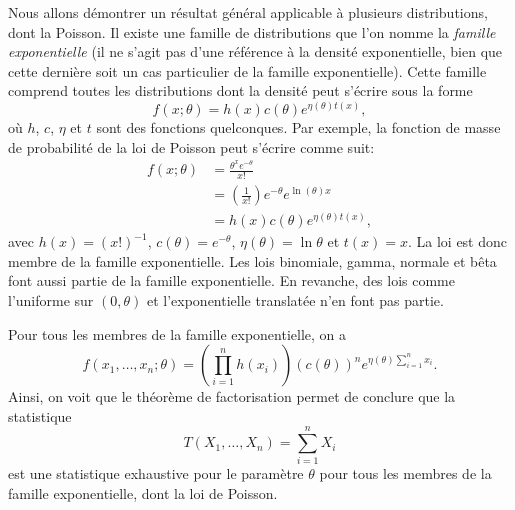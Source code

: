 \begin{solution}{3.13}
    Nous allons démontrer un résultat général applicable à plusieurs
    distributions, dont la Poisson. Il existe une famille de
    distributions que l'on nomme la \emph{famille exponentielle} (il
    ne s'agit pas d'une référence à la densité exponentielle, bien que
    cette dernière soit un cas particulier de la famille
    exponentielle). Cette famille comprend toutes les distributions
    dont la densité peut s'écrire sous la forme
    \begin{displaymath}
      f(x; \theta) = h(x) c(\theta) e^{\eta(\theta) t(x)},
    \end{displaymath}
    où $h$, $c$, $\eta$ et $t$ sont des fonctions quelconques. Par
    exemple, la fonction de masse de probabilité de la loi de Poisson
    peut s'écrire comme suit:
    \begin{align*}
      f(x; \theta) &= \frac{\theta^x e^{-\theta}}{x!} \\
      &= \left( \frac{1}{x!} \right) e^{-\theta} e^{\ln(\theta) x} \\
      &= h(x) c(\theta) e^{\eta(\theta) t(x)},
    \end{align*}
    avec $h(x) = (x!)^{-1}$, $c(\theta) = e^{-\theta}$, $\eta(\theta)
    = \ln \theta$ et $t(x) = x$. La loi est donc membre de la famille
    exponentielle. Les lois binomiale, gamma, normale et bêta font
    aussi partie de la famille exponentielle. En revanche, des lois
    comme l'uniforme sur $(0,\theta)$ et l'exponentielle translatée
    n'en font pas partie.

    Pour tous les membres de la famille exponentielle, on a
    \begin{equation*}
      f(x_1, \dots, x_n; \theta) =
      \left( \prod_{i = 1}^n h(x_i) \right)
      (c(\theta))^n
      e^{ \eta(\theta) \sum_{i=1}^n x_i}.
    \end{equation*}
    Ainsi, on voit que le théorème de factorisation permet de conclure
    que la statistique
    \begin{displaymath}
      T(X_1, \dots, X_n)  = \sum_{i = 1}^n X_i
    \end{displaymath}
    est une statistique exhaustive pour le paramètre $\theta$ pour
    tous les membres de la famille exponentielle, dont la loi de
    Poisson.
  
\end{solution}

